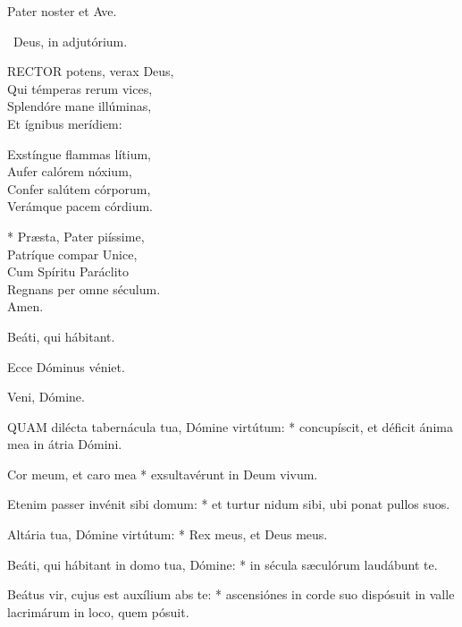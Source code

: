 

\sectionornament


Pater noster et Ave.

\V\ Deus, in adjutórium.


\lettrine[lines=2]{R}{ECTOR} potens, verax Deus,\\
Qui témperas rerum vices,\\
Splendóre mane illúminas,\\
Et ígnibus merídiem:

Exstíngue flammas lítium,\\
Aufer calórem nóxium,\\
Confer salútem córporum,\\
Verámque pacem córdium.

* Præsta, Pater piíssime,\\
Patríque compar Unice,\\
Cum Spíritu Paráclito\\
Regnans per omne séculum.\\
Amen.

  Beáti, qui hábitant.


  Ecce Dóminus véniet.

  Veni, Dómine.


\lettrine[lines=2]{Q}{UAM} dilécta tabernácula tua, Dómine virtútum: * concupíscit, et déficit ánima mea in átria Dómini.

Cor meum, et caro mea * exsultavérunt in Deum vivum.

Etenim passer invénit sibi domum: * et turtur nidum sibi, ubi ponat pullos suos.

Altária tua, Dómine virtútum: * Rex meus, et Deus meus.

Beáti, qui hábitant in domo tua, Dómine: * in sécula sæculórum laudábunt te.

Beátus vir, cujus est auxílium abs te: * ascensiónes in corde suo dispósuit in valle lacrimárum in loco, quem pósuit.

